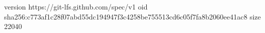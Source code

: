 version https://git-lfs.github.com/spec/v1
oid sha256:c773af1c28f07abd55dc194947f3c4258be755513cd6c05f7fa8b2060ee41ac8
size 22040
